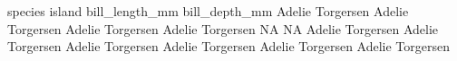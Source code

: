 \documentclass[
  letterpaper,
  DIV=11,
  numbers=noendperiod]{scrartcl}
\begin{document}
\startplacetable[location=none]
\startxtable
\startxtablehead[head]
\startxrowgroup[lastrow]
\startxrow
\startxcell species \stopxcell
\startxcell island \stopxcell
\startxcell bill_length_mm \stopxcell
\startxcell bill_depth_mm \stopxcell
\stopxrow
\stopxrowgroup
\stopxtablehead
\startxtablebody[body]
\startxrow
\startxcell Adelie \stopxcell
\startxcell Torgersen \stopxcell
{} \stopxcell
{} \stopxcell
\stopxrow
\startxrow
\startxcell Adelie \stopxcell
\startxcell Torgersen \stopxcell
{} \stopxcell
{} \stopxcell
\stopxrow
\startxrow
\startxcell Adelie \stopxcell
\startxcell Torgersen \stopxcell
{} \stopxcell
{} \stopxcell
\stopxrow
\startxrow
\startxcell Adelie \stopxcell
\startxcell Torgersen \stopxcell
\startxcell NA \stopxcell
\startxcell NA \stopxcell
\stopxrow
\startxrow
\startxcell Adelie \stopxcell
\startxcell Torgersen \stopxcell
{} \stopxcell
{} \stopxcell
\stopxrow
\startxrow
\startxcell Adelie \stopxcell
\startxcell Torgersen \stopxcell
{} \stopxcell
{} \stopxcell
\stopxrow
\startxrow
\startxcell Adelie \stopxcell
\startxcell Torgersen \stopxcell
{} \stopxcell
{} \stopxcell
\stopxrow
\startxrow
\startxcell Adelie \stopxcell
\startxcell Torgersen \stopxcell
{} \stopxcell
{} \stopxcell
\stopxrow
\startxrow
\startxcell Adelie \stopxcell
\startxcell Torgersen \stopxcell
{} \stopxcell
{} \stopxcell
\stopxrow
\startxrowgroup[lastrow]
\startxrow
\startxcell Adelie \stopxcell
\startxcell Torgersen \stopxcell
{} \stopxcell
{} \stopxcell
\stopxrow
\stopxrowgroup
\stopxtablebody
\startxtablefoot[foot]
\stopxtablefoot
\stopxtable
\stopplacetable

\stopsectionlevel
\end{document}
